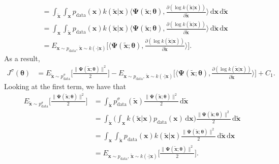 \documentclass[10pt]{article}
\newcommand{\dee}{\mathrm{d}}
\newcommand{\ve}[1]{\mathbf{#1}}
\newcommand{\mrm}[1]{\mathrm{#1}}
\newcommand{\ves}[1]{\boldsymbol{#1}}
\begin{document}
\begin{itemize}
\begin{align*}
    &= \int_{\widetilde{\ve{x}}} \int_{\ve{x}} p_{\mrm{data}}(\ve{x}) k(\widetilde{\ve{x}}|\ve{x}) \bigg\langle \ves{\Psi}(\widetilde{\ve{x}};\ves{\theta}),  \frac{\partial (\log k(\widetilde{\ve{x}}|\ve{x})) }{\partial \widetilde{\ve{x}}} \bigg\rangle\, \dee\ve{x}\,\dee\widetilde{\ve{x}} \\
    &= \int_{\ve{x}} \int_{\widetilde{\ve{x}}} p_{\mrm{data}}(\ve{x}) k(\widetilde{\ve{x}}|\ve{x}) \bigg\langle \ves{\Psi}(\widetilde{\ve{x}};\ves{\theta}),  \frac{\partial (\log k(\widetilde{\ve{x}}|\ve{x})) }{\partial \widetilde{\ve{x}}} \bigg\rangle\,\dee\widetilde{\ve{x}}\, \dee\ve{x} \\
    &= E_{\ve{x}\sim p_{\mrm{data}},\, \widetilde{\ve{x}} \sim k(\cdot|\ve{x})}\bigg[ \bigg\langle \ves{\Psi}(\widetilde{\ve{x}};\ves{\theta}),  \frac{\partial (\log k(\widetilde{\ve{x}}|\ve{x})) }{\partial \widetilde{\ve{x}}} \bigg\rangle \bigg].
  \end{align*}
  As a result,
  \begin{align*}
    J^\sigma(\ves{\theta}) 
    &= 
    E_{\widetilde{\ve{x}} \sim p^\sigma_{\mrm{data}}}\bigg[ \frac{\| \ves{\Psi}(\widetilde{\ve{x}};\ves{\theta}) \|^2}{2} \bigg]
    - E_{\ve{x}\sim p_{\mrm{data}},\, \widetilde{\ve{x}} \sim k(\cdot|\ve{x})}\bigg[ \bigg\langle \ves{\Psi}(\widetilde{\ve{x}};\ves{\theta}),  \frac{\partial (\log k(\widetilde{\ve{x}}|\ve{x})) }{\partial \widetilde{\ve{x}}} \bigg\rangle \bigg]
    + C_1.
  \end{align*}
  Looking at the first term, we have that
  \begin{align*}
    E_{\widetilde{\ve{x}} \sim p^\sigma_{\mrm{data}}}\bigg[ \frac{\| \ves{\Psi}(\widetilde{\ve{x}};\ves{\theta}) \|^2}{2} \bigg]
    &= \int_{\widetilde{\ve{x}}} p^\sigma_{\mrm{data}}(\widetilde{\ve{x}})\frac{\| \ves{\Psi}(\widetilde{\ve{x}};\ves{\theta}) \|^2}{2} \, \dee\widetilde{\ve{x}}\\ 
    &= \int_{\widetilde{\ve{x}}} \bigg( \int_{\ve{x}} k(\widetilde{\ve{x}}|\ve{x})p_{\mrm{data}}(\ve{x})\, \dee\ve{x}\bigg) \frac{\| \ves{\Psi}(\widetilde{\ve{x}};\ves{\theta}) \|^2}{2} \, \dee\widetilde{\ve{x}} \\
    &= \int_{\ve{x}} \int_{\widetilde{\ve{x}}} p_{\mrm{data}}(\ve{x}) k(\widetilde{\ve{x}}|\ve{x}) \frac{\| \ves{\Psi}(\widetilde{\ve{x}};\ves{\theta}) \|^2}{2} \, \dee\widetilde{\ve{x}}\, \dee\ve{x} \\
    &= E_{\ve{x}\sim p_{\mrm{data}},\, \widetilde{\ve{x}} \sim k(\cdot|\ve{x})}\bigg[ \frac{\| \ves{\Psi}(\widetilde{\ve{x}};\ves{\theta}) \|^2}{2} \bigg].

\end{align*}
\end{itemize}
\end{document}

